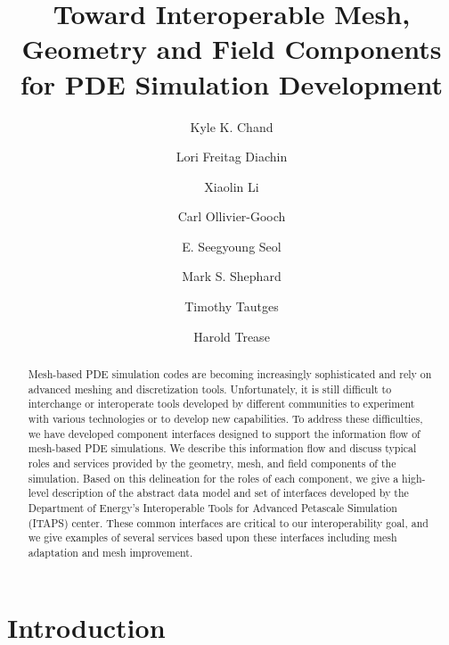 \documentclass[global]{svjour}
\begin{document}
\title{Toward Interoperable Mesh, Geometry and Field Components for PDE Simulation Development}

\author{Kyle K. Chand \and 
  Lori Freitag Diachin \and 
  Xiaolin Li \and
  Carl Ollivier-Gooch\and
  E. Seegyoung Seol \and
  Mark S. Shephard \and
  Timothy Tautges \and
  Harold Trease}

\maketitle

\begin{abstract}
Mesh-based PDE simulation codes are becoming increasingly
sophisticated and rely on advanced meshing and discretization tools.
Unfortunately, it is still difficult to interchange or interoperate
tools developed by different communities to experiment with various
technologies or to develop new capabilities.  To address these
difficulties, we have developed component interfaces designed to
support the information flow of mesh-based PDE simulations.  We
describe this information flow and discuss typical roles and services
provided by the geometry, mesh, and field components of the
simulation.  Based on this delineation for the roles of each
component, we give a high-level description of the abstract data model
and set of interfaces developed by the Department of Energy's
Interoperable Tools for Advanced Petascale Simulation (ITAPS)
center.  These common interfaces are critical to our interoperability
goal, and we give examples of several services based upon these
interfaces including mesh adaptation and mesh improvement.
\end{abstract}

\section{Introduction}

\end{document}
